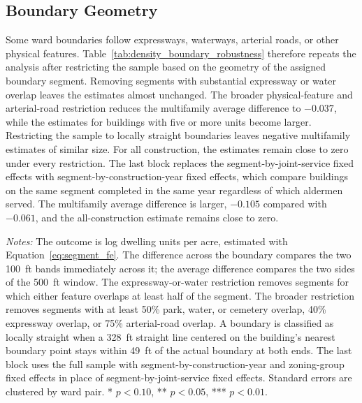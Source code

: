 \subsection{Boundary Geometry}
\label{subsec:density_boundary_geometry}

Some ward boundaries follow expressways, waterways, arterial roads, or other physical features.
Table~\ref{tab:density_boundary_robustness} therefore repeats the analysis after restricting the sample based on the geometry of the assigned boundary segment.
Removing segments with substantial expressway or water overlap leaves the estimates almost unchanged.
The broader physical-feature and arterial-road restriction reduces the multifamily average difference to $-0.037$, while the estimates for buildings with five or more units become larger.
Restricting the sample to locally straight boundaries leaves negative multifamily estimates of similar size.
For all construction, the estimates remain close to zero under every restriction.
The last block replaces the segment-by-joint-service fixed effects with segment-by-construction-year fixed effects, which compare buildings on the same segment completed in the same year regardless of which aldermen served.
The multifamily average difference is larger, $-0.105$ compared with $-0.061$, and the all-construction estimate remains close to zero.

\begin{table}[htbp]
    \centering
    \caption{Density Estimates Along Different Types of Ward Boundaries and With Segment-by-Year Fixed Effects}
    \label{tab:density_boundary_robustness}
    \resizebox{0.9\textwidth}{!}{%
    }
    \begin{minipage}{0.9\textwidth}
        \vspace{0.35em}
        \footnotesize
        \textit{Notes:} The outcome is log dwelling units per acre, estimated with Equation~\eqref{eq:segment_fe}.
        The difference across the boundary compares the two 100~ft bands immediately across it; the average difference compares the two sides of the 500~ft window.
        The expressway-or-water restriction removes segments for which either feature overlaps at least half of the segment.
        The broader restriction removes segments with at least 50\% park, water, or cemetery overlap, 40\% expressway overlap, or 75\% arterial-road overlap.
        A boundary is classified as locally straight when a 328~ft straight line centered on the building's nearest boundary point stays within 49~ft of the actual boundary at both ends.
        The last block uses the full sample with segment-by-construction-year and zoning-group fixed effects in place of segment-by-joint-service fixed effects.
        Standard errors are clustered by ward pair.
        * $p<0.10$, ** $p<0.05$, *** $p<0.01$.
    \end{minipage}
\end{table}

